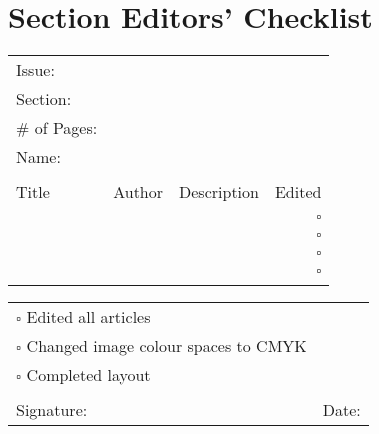 \chapter{Section Editors' Checklist}
\begin{tabular}{p{3cm} p{2cm} p{7cm} r } 
Issue: & & &\\
Section: & & &\\ 
\# of Pages: & & &\\
Name: & & &\\ \\ 
\toprule
Title & Author & Description & Edited\\ \midrule \\
  &   &  & $\square$ \\ \\
  &   &  & $\square$ \\ \\
  &   &  & $\square$ \\ \\
  &   &  & $\square$ \\ \\	
 \bottomrule 
\end{tabular}

\begin{tabular}{p{9cm} p{5cm}  } \\ 
$\square$ Edited all articles &\\ 
$\square$ Changed image colour spaces to CMYK &\\
$\square$ Completed layout &\\ \\
Signature: & Date:\\ 
\end{tabular}










 

